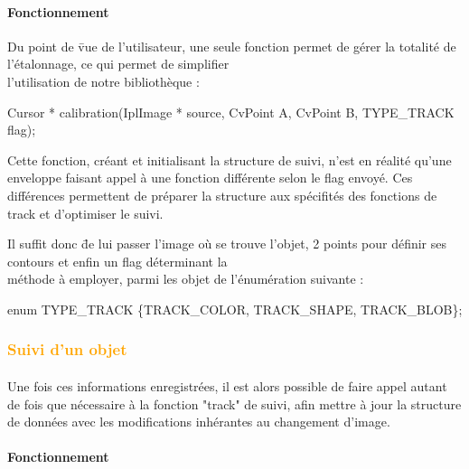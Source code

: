 \documentclass{report}
\begin{document}
					\paragraph{Fonctionnement}
					\begin{tabbing}
					\quad Du point de \=vue de l'utilisateur, une seule fonction permet de gérer la totalité de l'étalonnage, ce qui permet de simplifier\\ l'utilisation de notre bibliothèque : \\
					\>\begin{itshape}Cursor * calibration(IplImage * source, CvPoint A, CvPoint B, TYPE\_TRACK flag);\end{itshape}
					\end {tabbing}
					\quad Cette fonction, créant et initialisant la structure de suivi, n'est en réalité qu'une enveloppe faisant appel à une fonction différente selon le flag envoyé. Ces différences permettent de préparer la structure aux spécifités des fonctions de track et d'optimiser le suivi.
					\begin{tabbing}
					\quad Il suffit donc \=de lui passer l'image où se trouve l'objet, 2 points pour définir ses contours et enfin un flag déterminant la\\ méthode à employer, parmi les objet de l'énumération suivante : \\
\> \begin{itshape}enum TYPE\_TRACK \{TRACK\_COLOR, TRACK\_SHAPE, TRACK\_BLOB\};\end{itshape}
					\end{tabbing}
				\subsubsection{\textcolor{orange}{Suivi d'un objet}} \paragraph{}
				Une fois ces informations enregistrées, il est alors possible de faire appel autant de fois que nécessaire à la fonction "track" de suivi, afin mettre à jour la structure de données avec les modifications inhérantes au changement d'image.
						\paragraph{Fonctionnement}\paragraph{}
\end{document}
